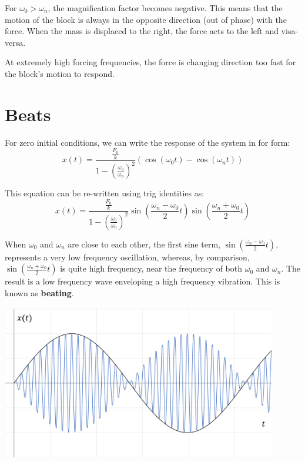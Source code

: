 \documentclass[12pt,letterpaper,twoside]{report}
\begin{document}
For $\omega_0 > \omega_n$, the magnification factor becomes negative.  This means that the motion of the block is always in the opposite direction (out of phase) with the force.  When the mass is displaced to the right, the force acts to the left and visa-versa. 

At extremely high forcing frequencies, the force is changing direction too fast for the block's motion to respond.  

\newpage

\section{Beats}
For zero initial conditions, we can write the response of the system in for form: 
\[
\displaystyle x(t) = \frac{\displaystyle \frac{F_0}{k}}{1- \left( \displaystyle \frac{\omega_0}{\omega_n} \right)^2} \left( \cos (\omega_0 t) - \cos (\omega_n t) \right)
\]

This equation can be re-written using trig identities as:
\[
\displaystyle x(t) = \frac{\displaystyle \frac{F_0}{k}}{1- \left( \displaystyle \frac{\omega_0}{\omega_n} \right)^2} \sin \left( \frac{\omega_n-\omega_0}{2} t \right)  \sin \left( \frac{\omega_n+\omega_0}{2} t \right)  
\]

When $\omega_0$ and $\omega_n$ are close to each other, the first sine term, $\displaystyle \sin \left( \frac{\omega_n-\omega_0}{2} t \right)$, represents a very low frequency oscillation, whereas, by comparison, $\displaystyle \sin \left( \frac{\omega_n+\omega_0}{2} t \right)$ is quite high frequency, near the frequency of both $\omega_0$ and $\omega_n$. The result is a low frequency wave enveloping a high frequency vibration.  This is known as \textbf{beating}. 

\includegraphics[trim={0cm 0cm 0cm 0cm},clip,width=0.9\textwidth, center]{Slide88}
\end{document}

